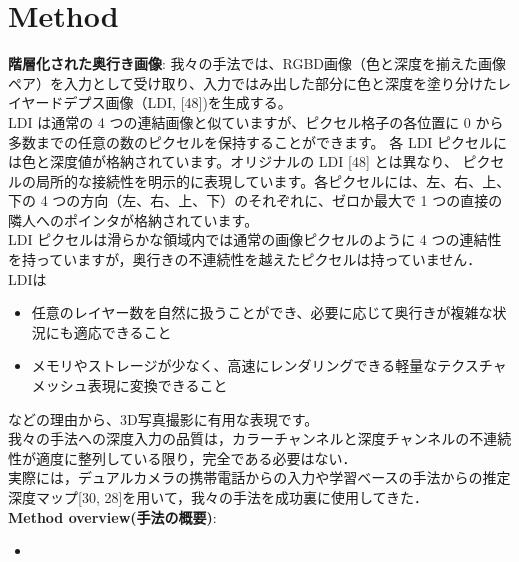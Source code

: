 \documentclass[a4paper,10pt,titlepage]{jsarticle}
\begin{document}
\section{Method}
\textbf{階層化された奥行き画像}:
我々の手法では、RGBD画像（色と深度を揃えた画像ペア）を入力として受け取り、入力ではみ出した部分に色と深度を塗り分けたレイヤードデプス画像（LDI, [48])を生成する。\\

LDI は通常の 4 つの連結画像と似ていますが、ピクセル格子の各位置に 0 から多数までの任意の数のピクセルを保持することができます。
各 LDI ピクセルには色と深度値が格納されています。オリジナルの LDI [48] とは異なり、 ピクセルの局所的な接続性を明示的に表現しています。各ピクセルには、左、右、上、下の 4 つの方向（左、右、上、下）のそれぞれに、ゼロか最大で 1 つの直接の隣人へのポインタが格納されています。\\

 LDI ピクセルは滑らかな領域内では通常の画像ピクセルのように 4 つの連結性を持っていますが，奥行きの不連続性を越えたピクセルは持っていません．\\

 LDIは
 \begin{itemize}
   \item 任意のレイヤー数を自然に扱うことができ、必要に応じて奥行きが複雑な状況にも適応できること
   \item メモリやストレージが少なく、高速にレンダリングできる軽量なテクスチャメッシュ表現に変換できること
 \end{itemize}
 などの理由から、3D写真撮影に有用な表現です。\\

 我々の手法への深度入力の品質は，カラーチャンネルと深度チャンネルの不連続性が適度に整列している限り，完全である必要はない．\\
実際には，デュアルカメラの携帯電話からの入力や学習ベースの手法からの推定深度マップ[30, 28]を用いて，我々の手法を成功裏に使用してきた．\\

\textbf{Method overview(手法の概要)}:



\begin{itemize}
  \item
\end{itemize}


\begin{thebibliography}{99}
\end{thebibliography}
\end{document}
